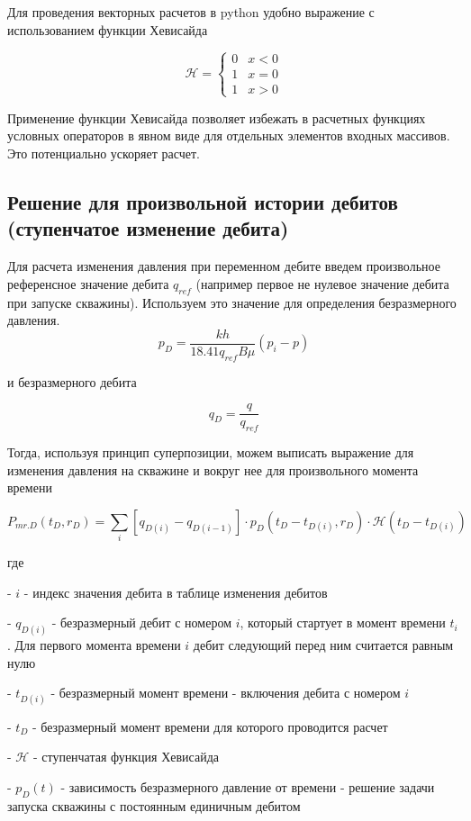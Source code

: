 \documentclass[oneside, openany]{memoir}
\begin{document}
	Для проведения векторных расчетов в python удобно выражение с использованием функции Хевисайда
	
	$$ \mathcal{H} = \begin{cases}0 & x < 0\\1 & x = 0\\1 & x > 0\end{cases}$$
	
	Применение функции Хевисайда позволяет избежать в расчетных функциях условных операторов в явном виде для отдельных элементов входных массивов. Это потенциально ускоряет расчет. 
	
	
	\subsection{Решение для произвольной истории дебитов (ступенчатое изменение дебита)} 
	
	Для расчета изменения давления при переменном дебите введем произвольное референсное значение дебита $ q_{ref} $ (например первое не нулевое значение дебита при запуске скважины). Используем это значение для определения безразмерного давления.
	$$ p_D = \frac{kh}{ 18.41 q_{ref} B \mu} \left( p_i - p \right) $$
	
	и безразмерного дебита 
	
	$$q_D = \frac{q}{q_{ref}} $$
	
	Тогда, используя принцип суперпозиции, можем выписать выражение для изменения давления на скважине и вокруг нее для произвольного момента времени
	
	\begin{equation}
	P_{mr.D}(t_D, r_D) = \sum_i \left[ q_{D(i)}-q_{D(i-1)} \right] \cdot p_D\left(t_D-t_{D(i)}, r_D\right)\cdot \mathcal{H}(t_D-t_{D(i)}) \tag{7} 
	\end{equation}
	
	где
	
	- $i$ - индекс значения дебита в таблице изменения дебитов
	
	- $q_{D(i)}$ - безразмерный дебит с номером $i$, который стартует в момент времени $t_i$. Для первого момента времени $i$ дебит следующий перед ним считается равным нулю
	
	- $t_{D(i)}$ - безразмерный момент времени - включения дебита с номером $i$
	
	- $t_{D}$ - безразмерный момент времени для которого проводится расчет
	
	- $\mathcal{H}$ - ступенчатая функция Хевисайда
	
	- $p_D\left(t\right)$ - зависимость безразмерного давление от времени - решение задачи запуска скважины с постоянным единичным дебитом
	
\end{document}
